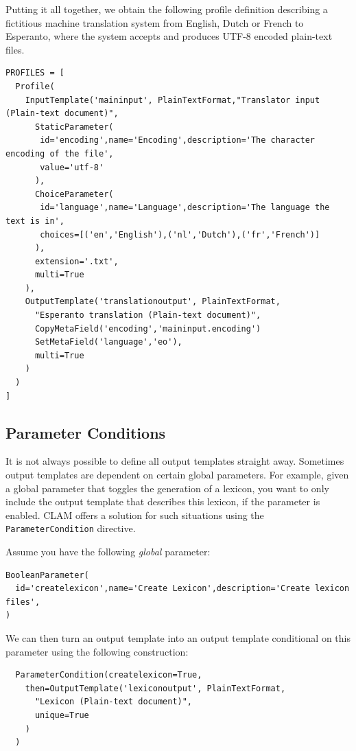 \documentclass[a4paper,12pt]{report}
\begin{document}
Putting it all together, we obtain the following profile definition describing a fictitious machine translation system from English, Dutch or French to Esperanto, where the system accepts and produces UTF-8 encoded plain-text files.

{\footnotesize{
\begin{verbatim}
PROFILES = [ 
  Profile( 
    InputTemplate('maininput', PlainTextFormat,"Translator input (Plain-text document)",  
      StaticParameter(
       id='encoding',name='Encoding',description='The character encoding of the file', 
       value='utf-8'
      ),  
      ChoiceParameter(
       id='language',name='Language',description='The language the text is in', 
       choices=[('en','English'),('nl','Dutch'),('fr','French')]
      ),
      extension='.txt',
      multi=True
    ), 
    OutputTemplate('translationoutput', PlainTextFormat,
      "Esperanto translation (Plain-text document)",  
      CopyMetaField('encoding','maininput.encoding')
      SetMetaField('language','eo'),
      multi=True
    )    
  )
]
\end{verbatim}
}}



\subsection{Parameter Conditions}

It is not always possible to define all output templates straight away. Sometimes output templates are dependent on certain global parameters. For example, given a global parameter that toggles the generation of a lexicon, you want to only include the output template that describes this lexicon, if the parameter is enabled. CLAM offers a solution for such situations using the \texttt{ParameterCondition} directive.

Assume you have the following \emph{global} parameter:

\begin{verbatim}
BooleanParameter(
  id='createlexicon',name='Create Lexicon',description='Create lexicon files', 
)
\end{verbatim}

We can then turn an output template into an output template conditional on this parameter using the following construction:

\begin{verbatim}
  ParameterCondition(createlexicon=True, 
    then=OutputTemplate('lexiconoutput', PlainTextFormat,
      "Lexicon (Plain-text document)",  
      unique=True
    ) 
  )
\end{verbatim}
\end{document}
